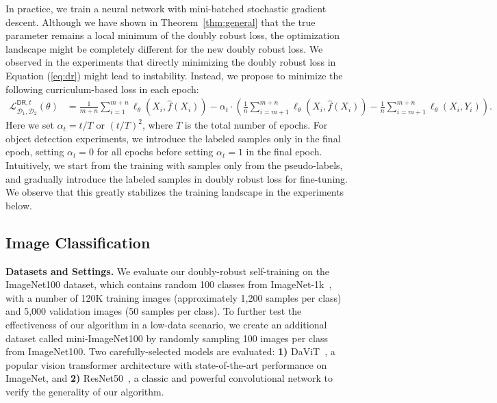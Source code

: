 In practice, we train a neural network with mini-batched stochastic gradient descent. Although we have shown in Theorem~\ref{thm:general} that the true parameter remains a local minimum of the doubly robust loss, the optimization landscape might be completely different for the new doubly robust loss. We observed in the experiments that directly minimizing the doubly robust loss in Equation (\ref{eq:dr}) might lead to instability. Instead, we propose to minimize the following curriculum-based loss in each epoch:
\begin{align}
\mathcal{L}^{\mathsf{DR}, t}_{\mathcal{D}_1,\mathcal{D}_2}(\theta) 
& = \frac{1}{m+n}  \sum_{i=1}^{m+n} \ell_\theta(X_i, \hat f(X_i)) - \alpha_t\cdot \left(  \frac{1}{n} \sum_{i=m+1}^{m+n} \ell_\theta(X_i, \hat f(X_i))  - \frac{1}{n} \sum_{i=m+1}^{m+n} \ell_\theta(X_i, Y_i)\right).  \label{eq:dr_weighted}
\end{align}
Here we set $\alpha_t = t/T$ or $(t/T)^2$, where $T$ is the total number of epochs. For object detection experiments, we introduce the labeled samples only in the final epoch, setting $\alpha_t = 0$ for all epochs before setting $\alpha_t = 1$ in the final epoch. Intuitively, we start from the training with samples only from the pseudo-labels, and gradually introduce the labeled samples in doubly robust loss for fine-tuning. We observe that this greatly stabilizes the training landscape in the experiments below.

\subsection{Image Classification}
\noindent \textbf{Datasets and Settings.}
We evaluate our doubly-robust self-training on the ImageNet100 dataset, which contains random 100 classes from ImageNet-1k~\citep{russakovsky2015imagenet}, with a number of 120K training images (approximately 1,200 samples per class) and 5,000 validation images (50 samples per class).
%
To further test the effectiveness of our algorithm in a low-data scenario, we create an additional dataset called mini-ImageNet100 by
randomly sampling 100 images per class from ImageNet100.
%
Two carefully-selected models are evaluated: \textbf{1)} DaViT~\citep{ding2022davit}, a popular vision transformer architecture with state-of-the-art performance on ImageNet, and \textbf{2)} ResNet50~\citep{he2016deep}, a classic and powerful convolutional network to verify the generality of our algorithm. 

